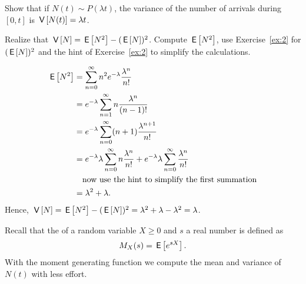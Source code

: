 \begin{exercise}
  Show that if $N(t)\sim P(\lambda t)$, the variance of the number of arrivals during $[0,t]$ is $\,\mathsf{V}\left[N(t)\right] = \lambda t$. 
  \begin{hint}
Realize that $\,\mathsf{V}\left[N\right] = \,\mathsf{E}\left[N^2\right] - (\,\mathsf{E}\left[N\right])^2$. Compute $\,\mathsf{E}\left[N^2\right]$, use Exercise~\ref{ex:2} for $(\,\mathsf{E}\left[N\right])^2$ and the hint of Exercise~\ref{ex:2} to simplify the calculations. 
  \end{hint}
  \begin{solution} 

    \begin{align*}
      \,\mathsf{E}\left[N^2\right]
&= \sum_{n=0}^\infty n^2 e^{-\lambda}\frac{\lambda^n}{n!}  \\
&= e^{-\lambda} \sum_{n=1}^\infty n \frac{\lambda^n}{(n-1)!}  \\
&= e^{-\lambda} \sum_{n=0}^\infty (n+1) \frac{\lambda^{n+1}}{n!}  \\
&= e^{-\lambda} \lambda \sum_{n=0}^\infty n \frac{\lambda^{n}}{n!}  +e^{-\lambda}\lambda \sum_{n=0}^\infty\frac{\lambda^{n}}{n!}  \\
&\quad\text{now use the hint to simplify the first summation} \\
&= \lambda^2  + \lambda.
\end{align*}
Hence, $\,\mathsf{V}\left[N\right] = \,\mathsf{E}\left[N^2\right] - (\,\mathsf{E}\left[N\right])^2 = \lambda^2 + \lambda - \lambda^2 = \lambda$.
\end{solution}
\end{exercise}

Recall that the   of a random variable $X\geq 0$ and $s$ a real number is defined as
\begin{equation*}
  M_X(s) = \,\mathsf{E}\left[e^{s X}\right].
\end{equation*}
With the moment generating function we compute the mean and variance of $N(t)$ with less effort. 


